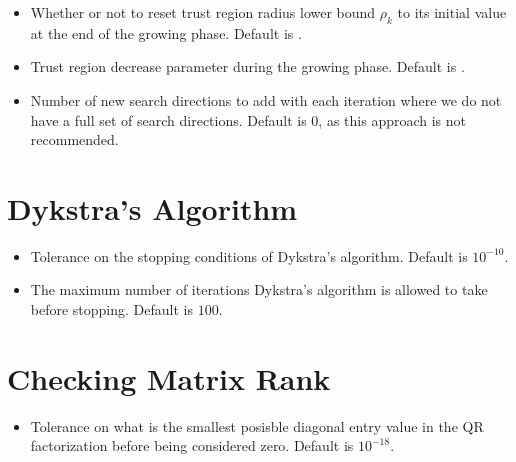 \documentclass[letterpaper,10pt,english]{sphinxmanual}
\begin{document}
\begin{itemize}
\item {} 
 \sphinxhyphen{} Whether or not to reset trust region radius lower bound \(\rho_k\) to its initial value at the end of the growing phase. Default is .

\item {} 
 \sphinxhyphen{} Trust region decrease parameter during the growing phase. Default is .

\item {} 
 \sphinxhyphen{} Number of new search directions to add with each iteration where we do not have a full set of search directions. Default is 0, as this approach is not recommended.

\end{itemize}


\section{Dykstra’s Algorithm}
\label{\detokenize{advanced:dykstra-s-algorithm}}\begin{itemize}
\item {} 
 \sphinxhyphen{} Tolerance on the stopping conditions of Dykstra’s algorithm. Default is \(10^{-10}\).

\item {} 
 \sphinxhyphen{} The maximum number of iterations Dykstra’s algorithm is allowed to take before stopping. Default is \(100\).

\end{itemize}


\section{Checking Matrix Rank}
\label{\detokenize{advanced:checking-matrix-rank}}\begin{itemize}
\item {} 
 \sphinxhyphen{} Tolerance on what is the smallest posisble diagonal entry value in the QR factorization before being considered zero. Default is \(10^{-18}\).

\end{itemize}
\end{document}
